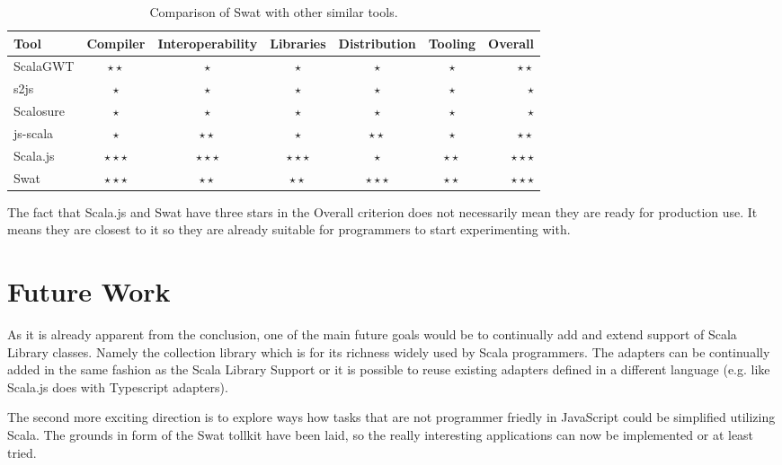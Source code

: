 \documentclass[12pt,a4paper]{report}
\begin{document}
\begin{table}[h]\footnotesize
	\def\arraystretch{1.5}
	\centering
	\begin{tabular}{l || c | c | c | c | c  || r}
		Tool				& Compiler 						& Interoperability	& Libraries 				& Distribution			& Tooling 					& Overall 					\\
		\hline						
	  ScalaGWT		& $\star\star$				&	$\star$						& $\star$						& $\star$						&	$\star$						& $\star\star$			\\
		s2js				& $\star$							& $\star$ 					& $\star$ 					&	$\star$						& $\star$						& $\star$			 			\\
		Scalosure		& $\star$							& $\star$ 					& $\star$ 					& $\star$						& $\star$						& $\star$			  		\\
		js-scala		& $\star$ 						& $\star\star$ 			& $\star$						& $\star\star$ 			& $\star$ 					& $\star\star$ 			\\
		Scala.js		& $\star\star\star$ 	& $\star\star\star$	& $\star\star\star$ &	$\star$						& $\star\star$			& $\star\star\star$ \\
		Swat				& $\star\star\star$ 	& $\star\star$			& $\star\star$			& $\star\star\star$	& $\star\star$			& $\star\star\star$ \\
	\end{tabular}
	\caption{Comparison of Swat with other similar tools.}
	\label{tbl:Comparison}
\end{table}

The fact that Scala.js and Swat have three stars in the Overall criterion does not necessarily mean they are ready for production use. It means they are closest to it so they are already suitable for programmers to start experimenting with.

\section{Future Work}

As it is already apparent from the conclusion, one of the main future goals would be to continually add and extend support of Scala Library classes. Namely the collection library which is for its richness widely used by Scala programmers. The adapters can be continually added in the same fashion as the Scala Library Support or it is possible to reuse existing adapters defined in a different language (e.g. like Scala.js does with Typescript adapters).

The second more exciting direction is to explore ways how tasks that are not programmer friedly in JavaScript could be simplified utilizing Scala. The grounds in form of the Swat tollkit have been laid, so the really interesting applications can now be implemented or at least tried.
\end{document}
